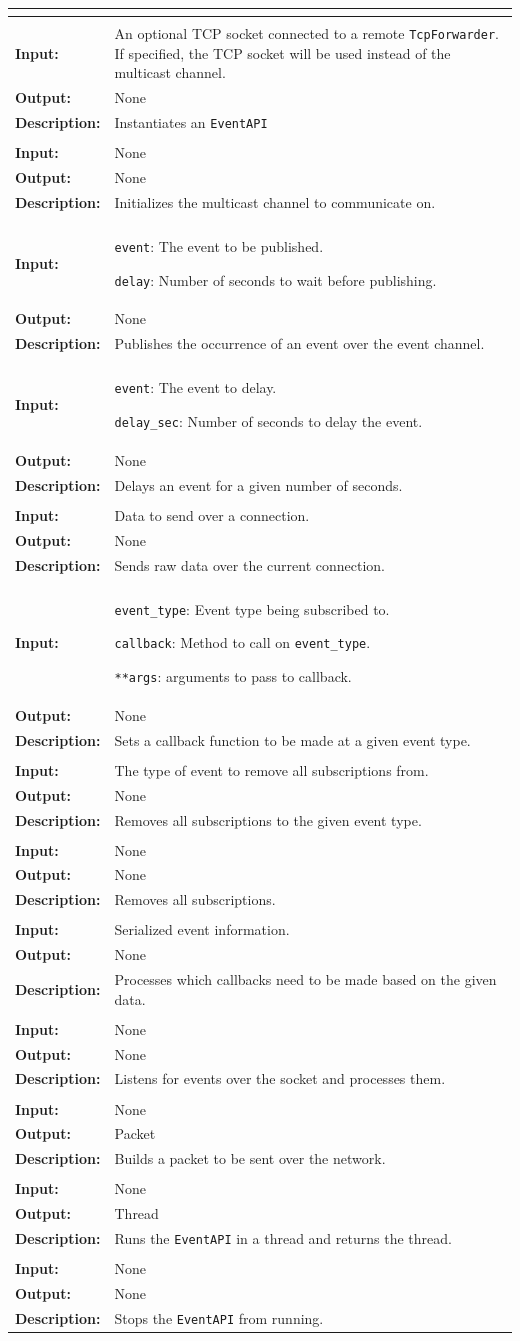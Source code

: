 \documentclass[titlepage]{article}
\renewenvironment{itemize*}
    {\begin{itemize}
        \setlength{\itemsep}{0pt}%
        \setlength{\parskip}{0pt}%
        \setlength{\partopsep}{0pt}%
        \setlength{\topsep}{0pt}}%
    {\end{itemize}}
\newcommand{\operations}[1]{
\begin{center}
    \begin{longtable}{|p{4cm}|p{10cm + 2.0\tabcolsep}|}
    \hline
    \multicolumn{2}{|l|}{\cellcolor[gray]{0.5}{\textbf{Operations}}} \\ \hline
#1
    \end{longtable}
\end{center}
}
\newcommand{\operation}[4]{
    \hline
    \multicolumn{2}{|l|}{\cellcolor[gray]{0.8}{\texttt{#1}}} \\ \hline
    \hspace{7pt}\textbf{Input:} & #2 \\ \hline
    \hspace{7pt}\textbf{Output:} & #3 \\ \hline
    \hspace{7pt}\textbf{Description:} & #4 \\ \hline
}
\begin{document}
\operations{
    \operation{\_\_init\_\_(tcp\_conn=None)}{An optional TCP socket connected to a remote \texttt{TcpForwarder}.  If specified, the TCP socket will be used instead of the multicast channel.}{None}{Instantiates an \texttt{EventAPI}}
    \operation{\_setup\_mc()}{None}{None}{Initializes the multicast channel to communicate on.}
    \operation{publish(event,delay\_sec)}
    {
        \begin{itemize*}
            \item \texttt{event}: The event to be published. 
            \item \texttt{delay}: Number of seconds to wait before publishing. 
        \end{itemize*}
    }{None}{Publishes the occurrence of an event over the event channel.}
    \operation{\_delay(event, delay\_sec)}
    {
        \begin{itemize*}
            \item \texttt{event}: The event to delay.
            \item \texttt{delay\_sec}: Number of seconds to delay the event. 
        \end{itemize*}
    }{None}{Delays an event for a given number of seconds.}
    \operation{push\_raw(raw)}{Data to send over a connection.}{None}{Sends raw data over the current connection.}
    \operation{subscribe(event\_type, callback, **args)}
    {
        \begin{itemize*}
            \item \texttt{event\_type}: Event type being subscribed to. 
            \item \texttt{callback}: Method to call on \texttt{event\_type}.
            \item \texttt{**args}: arguments to pass to callback.
        \end{itemize*}
    }{None}{Sets a callback function to be made at a given event type.}
    \operation{unsubscribe\_all(event\_type)}{The type of event to remove all subscriptions from.}{None}{Removes all subscriptions to the given event type.}
    \operation{clear\_subscriptions()}{None}{None}{Removes all subscriptions.}
    \operation{\_process(data)}{Serialized event information.}{None}{Processes which callbacks need to be made based on the given data.}
    \operation{run()}{None}{None}{Listens for events over the socket and processes them.}
    \operation{\_tcp\_assemble()}{None}{Packet}{Builds a packet to be sent over the network.}
    \operation{start()}{None}{Thread}{Runs the \texttt{EventAPI} in a thread and returns the thread.}
    \operation{stop()}{None}{None}{Stops the \texttt{EventAPI} from running. }
}
\end{document}
